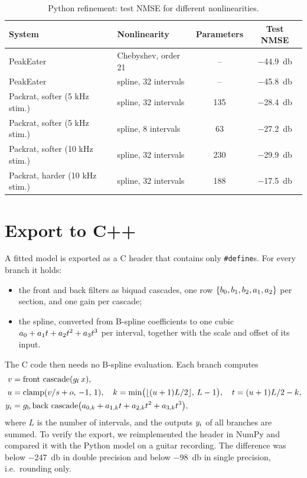 \begin{table}[htbp]
  \centering
  \caption{Python refinement: test NMSE for different nonlinearities.}
  \label{tab:impl_python}
  \begin{tabular}{llcc}
    \toprule
    System & Nonlinearity & Parameters & Test NMSE \\
    \midrule
    PeakEater & Chebyshev, order 21 & -- & \SI{-44.9}{\decibel} \\
    PeakEater & spline, 32 intervals & -- & \SI{-45.8}{\decibel} \\
    Packrat, softer (5 kHz stim.) & spline, 32 intervals & 135 & \SI{-28.4}{\decibel} \\
    Packrat, softer (5 kHz stim.) & spline, 8 intervals & 63 & \SI{-27.2}{\decibel} \\
    Packrat, softer (10 kHz stim.) & spline, 32 intervals & 230 & \SI{-29.9}{\decibel} \\
    Packrat, harder (10 kHz stim.) & spline, 32 intervals & 188 & \SI{-17.5}{\decibel} \\
    \bottomrule
  \end{tabular}
\end{table}


\section{Export to C++}
\label{sec:impl_export}

A fitted model is exported as a C header that contains only \texttt{\#define}s. For every branch it holds:
\begin{itemize}
  \item the front and back filters as biquad cascades, one row $\{b\sb{0}, b\sb{1}, b\sb{2}, a\sb{1}, a\sb{2}\}$ per section, and one gain per cascade;
  \item the spline, converted from B-spline coefficients to one cubic $a\sb{0} + a\sb{1}t + a\sb{2}t\sp{2} + a\sb{3}t\sp{3}$ per interval, together with the scale and offset of its input.
\end{itemize}
The C code then needs no B-spline evaluation. Each branch computes
\begin{align}
  v &= \text{front cascade}(g\sb{\mathrm{f}}\, x), \\
  u &= \operatorname{clamp}(v / s + o,\, -1,\, 1), \quad k = \min\!\big(\lfloor (u+1) L/2 \rfloor,\, L-1\big), \quad t = (u+1) L/2 - k, \\
  y\sb{i} &= g\sb{\mathrm{b}}\, \text{back cascade}\big(a\sb{0,k} + a\sb{1,k} t + a\sb{2,k} t\sp{2} + a\sb{3,k} t\sp{3}\big),
\end{align}
where $L$ is the number of intervals, and the outputs $y\sb{i}$ of all branches are summed. To verify the export, we reimplemented the header in NumPy and compared it with the Python model on a guitar recording. The difference was below \SI{-247}{\decibel} in double precision and below \SI{-98}{\decibel} in single precision, i.e.\ rounding only.


